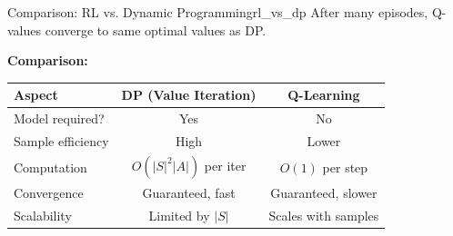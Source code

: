 \begin{example}{Comparison: RL vs. Dynamic Programming}{rl_vs_dp}
After many episodes, Q-values converge to same optimal values as DP.

\textbf{Comparison:}

\begin{center}
\begin{tabular}{lcc}
\toprule
\textbf{Aspect} & \textbf{DP (Value Iteration)} & \textbf{Q-Learning} \\
\midrule
Model required? & Yes & No \\
Sample efficiency & High & Lower \\
Computation & $O(|S|^2|A|)$ per iter & $O(1)$ per step \\
Convergence & Guaranteed, fast & Guaranteed, slower \\
Scalability & Limited by $|S|$ & Scales with samples \\
\bottomrule
\end{tabular}
\end{center}
\end{example}

